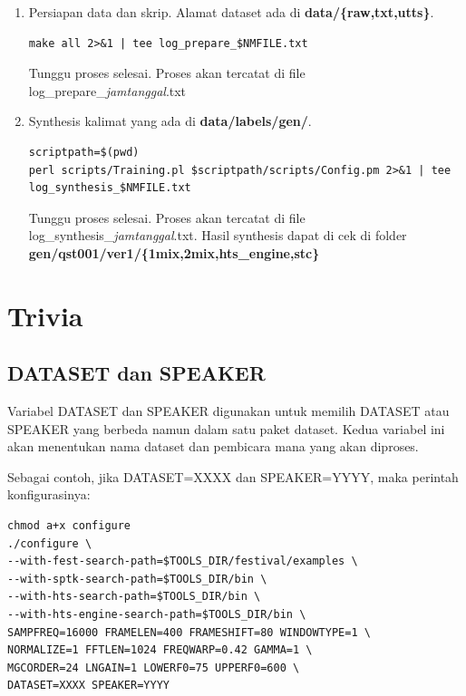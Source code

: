 \documentclass[12pt,]{article}
\begin{document}
\begin{enumerate}
		\item Persiapan data dan skrip.
		Alamat dataset ada di \textbf{data/\{raw,txt,utts\}}.
		\begin{verbatim}
make all 2>&1 | tee log_prepare_$NMFILE.txt
		\end{verbatim}
		
		Tunggu proses selesai.
		Proses akan tercatat di file log\_prepare\_\textit{jamtanggal}.txt
		
		\item Synthesis kalimat yang ada di \textbf{data/labels/gen/}.
		\begin{verbatim}
scriptpath=$(pwd)
perl scripts/Training.pl $scriptpath/scripts/Config.pm 2>&1 | tee log_synthesis_$NMFILE.txt
		\end{verbatim}
		
		Tunggu proses selesai.
		Proses akan tercatat di file log\_synthesis\_\textit{jamtanggal}.txt.
		Hasil synthesis dapat di cek di folder \textbf{gen/qst001/ver1/\{1mix,2mix,hts\_engine,stc\}}
		
	\end{enumerate}
	
	\newpage
	\mbox{}
		
	\newpage
	\section{Trivia}
	
	\subsection{DATASET dan SPEAKER}
	
	Variabel DATASET dan SPEAKER digunakan untuk memilih DATASET atau SPEAKER yang berbeda namun dalam satu paket dataset.
	Kedua variabel ini akan menentukan nama dataset dan pembicara mana yang akan diproses.
	
	Sebagai contoh, jika DATASET=XXXX dan SPEAKER=YYYY, maka perintah konfigurasinya:
	
	\begin{verbatim}
chmod a+x configure
./configure \
--with-fest-search-path=$TOOLS_DIR/festival/examples \
--with-sptk-search-path=$TOOLS_DIR/bin \
--with-hts-search-path=$TOOLS_DIR/bin \
--with-hts-engine-search-path=$TOOLS_DIR/bin \
SAMPFREQ=16000 FRAMELEN=400 FRAMESHIFT=80 WINDOWTYPE=1 \
NORMALIZE=1 FFTLEN=1024 FREQWARP=0.42 GAMMA=1 \
MGCORDER=24 LNGAIN=1 LOWERF0=75 UPPERF0=600 \
DATASET=XXXX SPEAKER=YYYY
	\end{verbatim}
	
\end{document}
